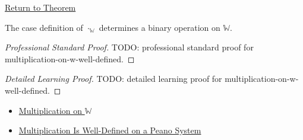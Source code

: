 \newpage
{}
\label{prf:multiplication-on-w-well-defined}

\begin{remark*}[Return]
\hyperref[thm:multiplication-on-w-well-defined]{Return to Theorem}
\end{remark*}

\begin{theorem*}
The case definition of $\cdot_{\mathbb{W}}$ determines a binary operation on
$\mathbb{W}$.
\end{theorem*}

\begin{proof}[Professional Standard Proof]
\LRAProofBodyStart
TODO: professional standard proof for multiplication-on-w-well-defined.
\end{proof}

\begin{proof}[Detailed Learning Proof]
\LRAProofBodyStart
TODO: detailed learning proof for multiplication-on-w-well-defined.
\end{proof}

\begin{remark*}
\end{remark*}

\begin{dependencies}
\begin{itemize}
  \item \hyperref[def:multiplication-on-w]{Multiplication on $\mathbb{W}$}
  \item \hyperref[thm:multiplication-well-defined-on-peano-system]{Multiplication Is Well-Defined on a Peano System}
\end{itemize}
\end{dependencies}

\clearpage
